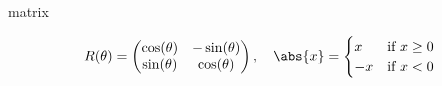 

	


\begin{saveblock}{matrix}
	\begin{highlightblock}[gobble=8,linewidth=\textwidth,framexleftmargin=0.25em]
		\begin{align*}
			R(\theta) = \begin{pmatrix}
				\cos(\theta) & -\sin(\theta)\\
				\sin(\theta) & \cos(\theta)
			\end{pmatrix},\quad
			\abs{x} = \begin{cases}
				x & \mbox{if $ x \geq 0$}\\
				-x & \mbox{if $ x < 0$}
			\end{cases}
		\end{align*}
	\end{highlightblock}
\end{saveblock}

